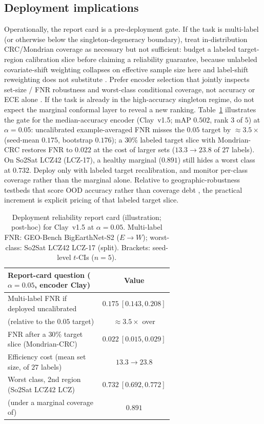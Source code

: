 \documentclass[preprint,11pt,authoryear]{elsarticle}
\begin{document}
\subsection{Deployment implications}\label{sec:reportcard}
Operationally, the report card is a pre-deployment gate. If the task is multi-label (or otherwise below
the singleton-degeneracy boundary), treat in-distribution CRC/Mondrian coverage as necessary but not
sufficient: budget a labeled target-region calibration slice before claiming a reliability guarantee,
because unlabeled covariate-shift weighting collapses on effective sample size here and label-shift
reweighting does not substitute \citep{tibshirani2019covariate}. Prefer encoder selection that jointly
inspects set-size / FNR robustness and worst-class conditional coverage, not accuracy or ECE alone
\citep{romano2020classification,cauchois2021knowing}. If the task is already in the high-accuracy
singleton regime, do not expect the marginal conformal layer to reveal a new ranking.
Table~\ref{tab:reportcard} illustrates the gate for the median-accuracy encoder (Clay~v1.5; mAP
$0.502$, rank $3$ of $5$) at $\alpha{=}0.05$: uncalibrated example-averaged FNR misses the $0.05$
target by ${\approx}3.5\times$ (seed-mean $0.175$, bootstrap $0.176$); a $30\%$ labeled target slice
with Mondrian-CRC restores FNR to $0.022$ at the cost of larger sets ($13.3\to23.8$ of $27$ labels). On
So2Sat LCZ42 (LCZ-17), a healthy marginal ($0.891$) still hides a worst class at $0.732$. Deploy
only with labeled target recalibration, and monitor per-class coverage rather than the marginal alone.
Relative to geographic-robustness testbeds that score OOD accuracy rather than coverage debt
\citep{doerksen2026earthshift,alemadi2025dsgr,meyer2021aoa}, the practical increment is explicit
pricing of that labeled target slice.

\begin{table}[htbp]\centering\small
\caption{Deployment reliability report card (illustration; post-hoc) for Clay~v1.5 at
$\alpha{=}0.05$. Multi-label FNR: GEO-Bench BigEarthNet-S2 ($E\!\to\!W$);
worst-class: So2Sat LCZ42 LCZ-17 (split). Brackets: seed-level $t$-CIs ($n{=}5$).}\label{tab:reportcard}
\vspace{0.75em}
\begin{tabular}{@{}p{0.64\linewidth}c@{}}
\toprule
Report-card question ($\alpha{=}0.05$, encoder Clay) & Value \\
\midrule
Multi-label FNR if deployed uncalibrated & $0.175\ [0.143,0.208]$ \\
\quad(relative to the $0.05$ target) & ${\approx}3.5\times$ over \\
FNR after a $30\%$ target slice (Mondrian-CRC) & $0.022\ [0.015,0.029]$ \\
Efficiency cost (mean set size, of $27$ labels) & $13.3\to23.8$ \\
Worst class, 2nd region (So2Sat LCZ42 LCZ) & $0.732\ [0.692,0.772]$ \\
\quad(under a marginal coverage of) & $0.891$ \\
\bottomrule
\end{tabular}
\end{table}
\end{document}
